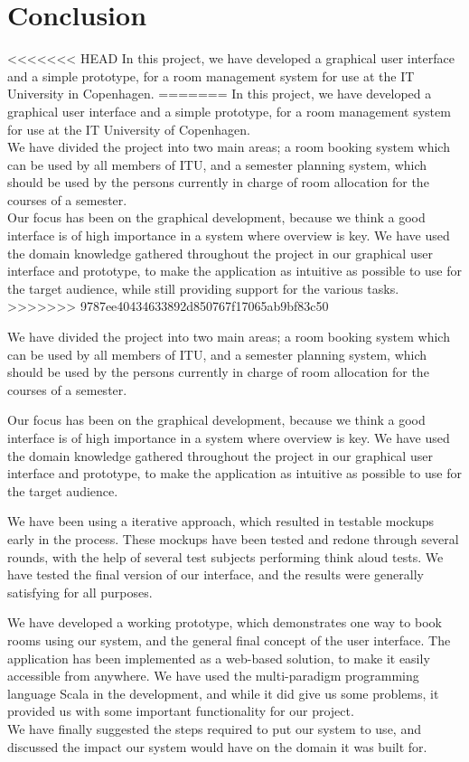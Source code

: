 \chapter{Conclusion}
<<<<<<< HEAD
In this project, we have developed a graphical user interface and a simple prototype, for a room management system for use at the IT University in Copenhagen.
=======
In this project, we have developed a graphical user interface and a simple prototype, for a room management system for use at the IT University of Copenhagen.\\
We have divided the project into two main areas; a room booking system which can be used by all members of ITU, and a semester planning system, which should be used by the persons currently in charge of room allocation for the courses of a semester.\\
Our focus has been on the graphical development, because we think a good interface is of high importance in a system where overview is key. We have used the domain knowledge gathered throughout the project in our graphical user interface and prototype, to make the application as intuitive as possible to use for the target audience, while still providing support for the various tasks. \\
>>>>>>> 9787ee40434633892d850767f17065ab9bf83c50

We have divided the project into two main areas; a room booking system which can be used by all members of ITU, and a semester planning system, which should be used by the persons currently in charge of room allocation for the courses of a semester.

Our focus has been on the graphical development, because we think a good interface is of high importance in a system where overview is key. We have used the domain knowledge gathered throughout the project in our graphical user interface and prototype, to make the application as intuitive as possible to use for the target audience. 

We have been using a iterative approach, which resulted in testable mockups early in the process. These mockups have been tested and redone through several rounds, with the help of several test subjects performing think aloud tests. We have tested the final version of our interface, and the results were generally satisfying for all purposes.

We have developed a working prototype, which demonstrates one way to book rooms using our system, and the general final concept of the user interface. The application has been implemented as a web-based solution, to make it easily accessible from anywhere. We have used the multi-paradigm programming language Scala in the development, and while it did give us some problems, it provided us with some important functionality for our project.\\

We have finally suggested the steps required to put our system to use, and discussed the impact our system would have on the domain it was built for.